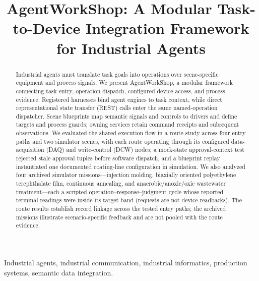 \documentclass[journal]{IEEEtran}
\begin{document}

\title{AgentWorkShop: A Modular Task-to-Device Integration Framework for Industrial Agents}

\author{}

\maketitle

\begin{abstract}
Industrial agents must translate task goals into operations over
scene-specific equipment and process signals. We present AgentWorkShop, a
modular framework connecting task entry, operation dispatch, configured device
access, and process evidence. Registered harnesses bind agent engines to task
context, while direct representational state transfer (REST) calls enter the
same named-operation dispatcher.
Scene blueprints map semantic signals and controls to drivers and define
targets and process guards; owning services retain command receipts and
subsequent observations. We evaluated the shared execution flow in a route
study across four entry paths and two simulator scenes, with each route
operating through its configured data-acquisition (DAQ) and write-control
(DCW) nodes; a mock-state approval-context test rejected stale approval tuples
before software dispatch, and a blueprint replay instantiated one documented
coating-line configuration in simulation. We also analyzed four archived
simulator missions---injection molding, biaxially oriented polyethylene
terephthalate film, continuous annealing, and anaerobic/anoxic/oxic wastewater
treatment---each a scripted operation--response--judgment cycle whose reported
terminal readings were inside its target band (requests are not device
readbacks). The route results establish record linkage across the tested entry
paths; the archived missions illustrate scenario-specific feedback and are not
pooled with the route evidence.
\end{abstract}

\begin{IEEEkeywords}
Industrial agents, industrial communication, industrial informatics,
production systems, semantic data integration.
\end{IEEEkeywords}

\IEEEpeerreviewmaketitle










\end{document}
